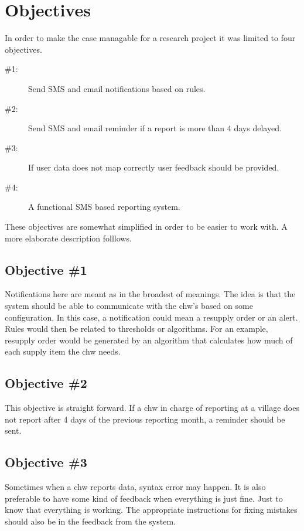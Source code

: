 \section{Objectives}
\label{sec:objectives}
In order to make the case managable for a research project it was limited to four objectives. 

\begin{description}
\item[\#1:] Send SMS and email notifications based on rules.\label{desc:objectiveone}
\item[\#2:] Send SMS and email reminder if a report is more than 4 days delayed.\label{desc:objectivetwo}
\item[\#3:] If user data does not map correctly user feedback should be provided.\label{desc:objectivethree}
\item[\#4:] A functional SMS based reporting system.\label{desc:objectivefour}
\end{description}

These objectives are somewhat simplified in order to be easier to work with. A more elaborate description folllows. 
\subsection{Objective \#1}
Notifications here are meant as in the broadest of meanings. The idea is that the system should be able to communicate with the \gls{chw}'s based on some configuration. In this case, a notification could mean a resupply order or an alert. Rules would then be related to thresholds or algorithms. For an example, resupply order would be generated by an algorithm that calculates how much of each supply item the \gls{chw} needs. 
\subsection{Objective \#2}
This objective is straight forward. If a \gls{chw} in charge of reporting at a village does not report after 4 days of the previous reporting month, a reminder should be sent. 
\subsection{Objective \#3}
Sometimes when a \gls{chw} reports data, syntax error may happen. It is also preferable to have some kind of feedback when everything is just fine. Just to know that everything is working. 
The appropriate instructions for fixing mistakes should also be in the feedback from the system.
